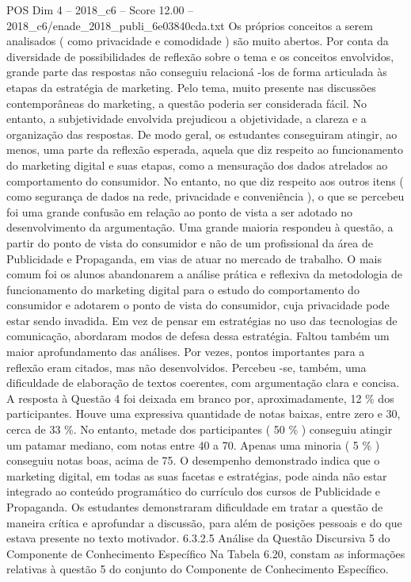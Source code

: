 \begin{textsample}{POS Dim 4 – 2018\_c6 – Score 12.00 – 2018\_c6/enade\_2018\_publi\_6e03840cda.txt}
Os próprios conceitos a serem analisados ( como privacidade e comodidade ) são muito abertos.
Por conta da diversidade de possibilidades de reflexão sobre o tema e os conceitos envolvidos, grande parte das respostas não conseguiu relacioná -los de forma articulada às etapas da estratégia de marketing.
Pelo tema, muito presente nas discussões contemporâneas do marketing, a questão poderia ser considerada fácil.
No entanto, a subjetividade envolvida prejudicou a objetividade, a clareza e a organização das respostas.
De modo geral, os estudantes conseguiram atingir, ao menos, uma parte da reflexão esperada, aquela que diz respeito ao funcionamento do marketing digital e suas etapas, como a mensuração dos dados atrelados ao comportamento do consumidor.
No entanto, no que diz respeito aos outros itens ( como segurança de dados na rede, privacidade e conveniência ), o que se percebeu foi uma grande confusão em relação ao ponto de vista a ser adotado no desenvolvimento da argumentação.
Uma grande maioria respondeu à questão, a partir do ponto de vista do consumidor e não de um profissional da área de Publicidade e Propaganda, em vias de atuar no mercado de trabalho.
O mais comum foi os alunos abandonarem a análise prática e reflexiva da metodologia de funcionamento do marketing digital para o estudo do comportamento do consumidor e adotarem o ponto de vista do consumidor, cuja privacidade pode estar sendo invadida.
Em vez de pensar em estratégias no uso das tecnologias de comunicação, abordaram modos de defesa dessa estratégia.
Faltou também um maior aprofundamento das análises.
Por vezes, pontos importantes para a reflexão eram citados, mas não desenvolvidos.
Percebeu -se, também, uma dificuldade de elaboração de textos coerentes, com argumentação clara e concisa.
A resposta à Questão 4 foi deixada em branco por, aproximadamente, 12 \% dos participantes.
Houve uma expressiva quantidade de notas baixas, entre zero e 30, cerca de 33 \%.
No entanto, metade dos participantes ( 50 \% ) conseguiu atingir um patamar mediano, com notas entre 40 a 70.
Apenas uma minoria ( 5 \% ) conseguiu notas boas, acima de 75.
O desempenho demonstrado indica que o marketing digital, em todas as suas facetas e estratégias, pode ainda não estar integrado ao conteúdo programático do currículo dos cursos de Publicidade e Propaganda.
Os estudantes demonstraram dificuldade em tratar a questão de maneira crítica e aprofundar a discussão, para além de posições pessoais e do que estava presente no texto motivador. 6.3.2.5 Análise da Questão Discursiva 5 do Componente de Conhecimento Específico Na Tabela 6.20, constam as informações relativas à questão 5 do conjunto do Componente de Conhecimento Específico.

\end{textsample}
